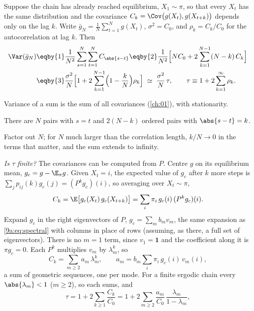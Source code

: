 Suppose the chain has already reached equilibrium, $X_1\sim\pi$, so that every $X_t$ has the
same distribution and the covariance $C_k=\Cov\bigl(g(X_t),g(X_{t+k})\bigr)$ depends only on the
lag $k$. Write $\bar g_N=\frac1N\sum_{t=1}^Ng(X_t)$, $\sigma^2=C_0$, and
$\rho_k=C_k/C_0$ for the autocorrelation at lag $k$. Then
\begin{align}
  \Var(\bar g_N)
  &\eqby{1}\frac1{N^2}\sum_{s=1}^N\sum_{t=1}^NC_{\abs{s-t}}
   \eqby{2}\frac1{N^2}\Bigl[NC_0+2\sum_{k=1}^{N-1}(N-k)\,C_k\Bigr] \nonumber\\
  &\eqby{3}\frac{\sigma^2}{N}\Bigl[1+2\sum_{k=1}^{N-1}\Bigl(1-\frac kN\Bigr)\rho_k\Bigr]
   \;\simeq\;\frac{\sigma^2}{N}\,\tau,
   \qquad \tau\equiv1+2\sum_{k=1}^\infty\rho_k .
  \label{9a:eq:var-time-average}
\end{align}
\begin{explain}
  \item Variance of a sum is the sum of all covariances (\cref{ch:01}), with stationarity.
  \item There are $N$ pairs with $s=t$ and $2(N-k)$ ordered pairs with $\abs{s-t}=k$.
  \item Factor out $N$; for $N$ much larger than the correlation length, $k/N\to0$ in the terms
        that matter, and the sum extends to infinity.
\end{explain}
\emph{Is $\tau$ finite?} The covariances can be computed from $P$. Centre $g$ on its
equilibrium mean, $g_c=g-\E_\pi g$. Given $X_t=i$, the expected value of $g_c$ after $k$ more
steps is $\sum_jp_{ij}(k)g_c(j)=(P^kg_c)(i)$, so averaging over $X_t\sim\pi$,
\begin{equation*}
  C_k=\E\bigl[g_c(X_t)\,g_c(X_{t+k})\bigr]=\sum_i\pi_i\,g_c(i)\,(P^kg_c)(i).
\end{equation*}
Expand $g_c$ in the right eigenvectors of $P$, $g_c=\sum_mb_mv_m$, the same expansion as
\eqref{9a:eq:spectral} with columns in place of rows (assuming, as there, a full set of
eigenvectors). There is no $m=1$ term, since $v_1=\mathbf1$ and the coefficient along it is
$\pi g_c=0$. Each $P^k$ multiplies $v_m$ by $\lambda_m^k$, so
\begin{equation*}
  C_k=\sum_{m\ge2}a_m\,\lambda_m^k,\qquad a_m=b_m\sum_i\pi_i\,g_c(i)\,v_m(i),
\end{equation*}
a sum of geometric sequences, one per mode. For a finite ergodic chain every
$\abs{\lambda_m}<1$ ($m\ge2$), so each sums, and
\begin{equation*}
  \tau=1+2\sum_{k\ge1}\frac{C_k}{C_0}=1+2\sum_{m\ge2}\frac{a_m}{C_0}\,\frac{\lambda_m}{1-\lambda_m},
\end{equation*}
